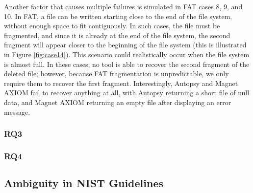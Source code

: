 \begin{paraphrase}
Another factor that causes multiple failures is simulated in FAT cases 8, 9, and 10.
In FAT, a file can be written starting close to the end of the file system, without enough space to fit contiguously.
In such cases, the file must be fragmented, and since it is already at the end of the file system, the second fragment will appear closer to the beginning of the file system (this is illustrated in Figure \ref{fig:case14}).
This scenario could realistically occur when the file system is almost full.
In these cases, no tool is able to recover the second fragment of the deleted file; however, because FAT fragmentation is unpredictable, we only require them to recover the first fragment.
Interestingly, Autopsy and Magnet AXIOM fail to recover anything at all, with Autopsy returning a short file of null data, and Magnet AXIOM returning an empty file after displaying an error message.
\end{paraphrase}

\subsubsection{RQ3}


\subsubsection{RQ4}



\subsection{Ambiguity in NIST Guidelines}
